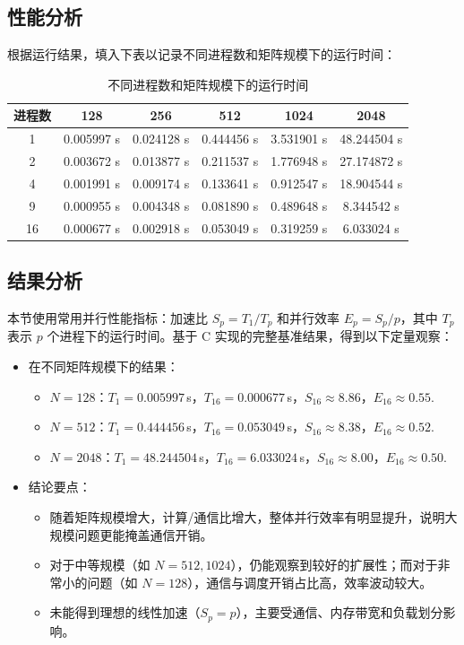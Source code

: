 \documentclass{SYSUReport}
\begin{document}
\subsection{性能分析}
根据运行结果，填入下表以记录不同进程数和矩阵规模下的运行时间：
\begin{table}[htpb]
\centering
\begin{tabular}{|c|c|c|c|c|c|}
\hline
进程数 & 128 & 256 & 512 & 1024 & 2048 \\ \hline
1      & 0.005997 s & 0.024128 s & 0.444456 s & 3.531901 s & 48.244504 s \\\hline
2      & 0.003672 s & 0.013877 s & 0.211537 s & 1.776948 s & 27.174872 s \\\hline
4      & 0.001991 s & 0.009174 s & 0.133641 s & 0.912547 s & 18.904544 s \\\hline
9      & 0.000955 s & 0.004348 s & 0.081890 s & 0.489648 s & 8.344542 s \\\hline
16     & 0.000677 s & 0.002918 s & 0.053049 s & 0.319259 s & 6.033024 s \\\hline
\end{tabular}
\caption{不同进程数和矩阵规模下的运行时间}
\label{tab:performance}
\end{table}

\subsection{结果分析}
本节使用常用并行性能指标：加速比 $S_p=T_1/T_p$ 和并行效率 $E_p=S_p/p$，其中 $T_p$ 表示 $p$ 个进程下的运行时间。基于 C 实现的完整基准结果，得到以下定量观察：

\begin{itemize}
    \item 在不同矩阵规模下的结果：
    \begin{itemize}
        \item $N=128$：$T_1=0.005997\,$s，$T_{16}=0.000677\,$s，$S_{16}\approx8.86$，$E_{16}\approx0.55$. 
        \item $N=512$：$T_1=0.444456\,$s，$T_{16}=0.053049\,$s，$S_{16}\approx8.38$，$E_{16}\approx0.52$. 
        \item $N=2048$：$T_1=48.244504\,$s，$T_{16}=6.033024\,$s，$S_{16}\approx8.00$，$E_{16}\approx0.50$. 
    \end{itemize}
    \item 结论要点：
    \begin{itemize}
        \item 随着矩阵规模增大，计算/通信比增大，整体并行效率有明显提升，说明大规模问题更能掩盖通信开销。
        \item 对于中等规模（如 $N=512,1024$），仍能观察到较好的扩展性；而对于非常小的问题（如 $N=128$），通信与调度开销占比高，效率波动较大。
        \item 未能得到理想的线性加速（$S_p=p$），主要受通信、内存带宽和负载划分影响。
    \end{itemize}
\end{itemize}
\end{document}
